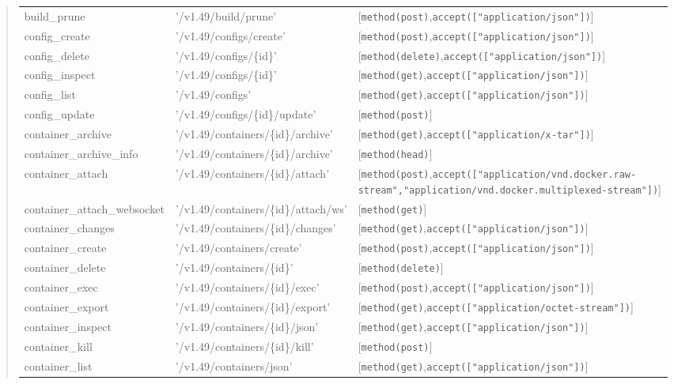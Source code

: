 \begin{description}
\begin{quote}
\begin{tabulary}{0.9\textwidth}{|l|L|L|}
\hline
build_prune & '/v1.49/build/prune' & [\verb$method(post)$,\verb$accept(["application/json"])$] \\
config_create & '/v1.49/configs/create' & [\verb$method(post)$,\verb$accept(["application/json"])$] \\
config_delete & '/v1.49/configs/\{id\}' & [\verb$method(delete)$,\verb$accept(["application/json"])$] \\
config_inspect & '/v1.49/configs/\{id\}' & [\verb$method(get)$,\verb$accept(["application/json"])$] \\
config_list & '/v1.49/configs' & [\verb$method(get)$,\verb$accept(["application/json"])$] \\
config_update & '/v1.49/configs/\{id\}/update' & [\verb$method(post)$] \\
container_archive & '/v1.49/containers/\{id\}/archive' & [\verb$method(get)$,\verb$accept(["application/x-tar"])$] \\
container_archive_info & '/v1.49/containers/\{id\}/archive' & [\verb$method(head)$] \\
container_attach & '/v1.49/containers/\{id\}/attach' & [\verb$method(post)$,\verb$accept(["application/vnd.docker.raw-stream","application/vnd.docker.multiplexed-stream"])$] \\
container_attach_websocket & '/v1.49/containers/\{id\}/attach/ws' & [\verb$method(get)$] \\
container_changes & '/v1.49/containers/\{id\}/changes' & [\verb$method(get)$,\verb$accept(["application/json"])$] \\
container_create & '/v1.49/containers/create' & [\verb$method(post)$,\verb$accept(["application/json"])$] \\
container_delete & '/v1.49/containers/\{id\}' & [\verb$method(delete)$] \\
container_exec & '/v1.49/containers/\{id\}/exec' & [\verb$method(post)$,\verb$accept(["application/json"])$] \\
container_export & '/v1.49/containers/\{id\}/export' & [\verb$method(get)$,\verb$accept(["application/octet-stream"])$] \\
container_inspect & '/v1.49/containers/\{id\}/json' & [\verb$method(get)$,\verb$accept(["application/json"])$] \\
container_kill & '/v1.49/containers/\{id\}/kill' & [\verb$method(post)$] \\
container_list & '/v1.49/containers/json' & [\verb$method(get)$,\verb$accept(["application/json"])$] \\

\end{tabulary}
\end{quote}
\end{description}
